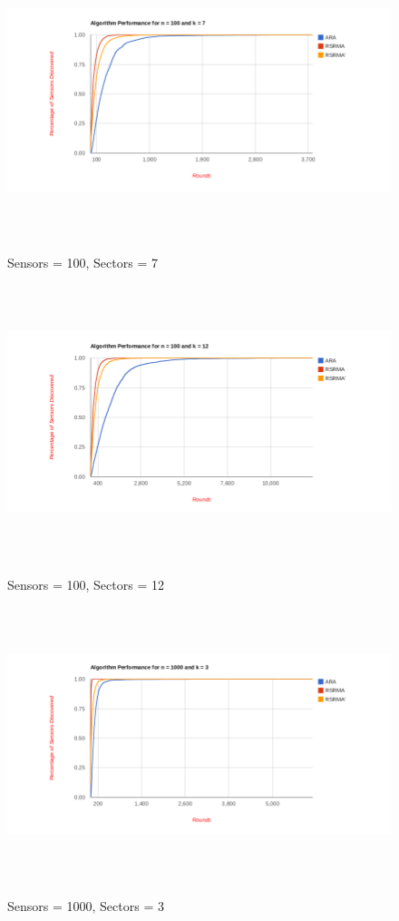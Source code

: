 \begin{figure}[ht]
\caption{Sensors = 100, Sectors = 7}
\includegraphics[height = 8cm]{pics/graph100k7.png}\\[0.5cm]   
\label{fig:n100k7} 
\end{figure}

\begin{figure}[ht]
\caption{Sensors = 100, Sectors = 12}
\includegraphics[height = 8cm]{pics/graph100k12.png}\\[0.5cm] 
\label{fig:n100k12}   
\end{figure}


\begin{figure}[ht]
\caption{Sensors = 1000, Sectors = 3}
\includegraphics[height = 8cm]{pics/graph1000k3.png}\\[0.5cm]    
\label{fig:n1000k3}
\end{figure}

